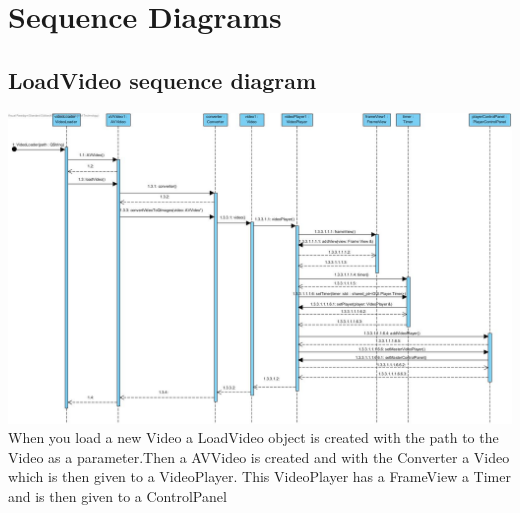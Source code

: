\documentclass[twoside]{book}
\newcommand{\+}{\discretionary{\mbox{\scriptsize$\hookleftarrow$}}{}{}}
\begin{document}
\section{Sequence Diagrams}
\subsection*{LoadVideo sequence diagram}
{\centering\includegraphics[width=1\textwidth]{SequenceDiagram1.jpg}}\\
When you load a new Video a LoadVideo object is created with the path to the Video as a parameter.Then a AVVideo is created and with the Converter a Video which is then given to a VideoPlayer. This VideoPlayer has a FrameView a Timer and is then given to a ControlPanel
\newpage
\end{document}
